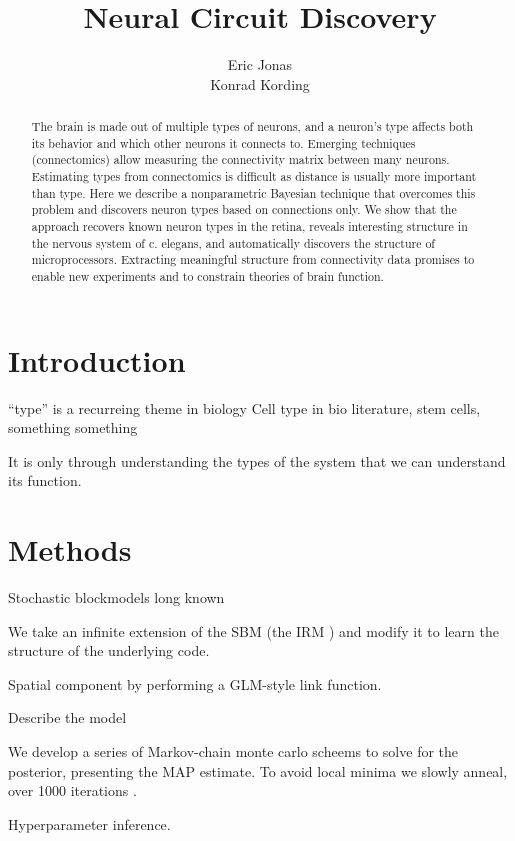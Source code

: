 \documentclass{article}
\title{Neural Circuit Discovery}
\author{Eric Jonas \\ Konrad Kording}
\begin{document}
\maketitle

\listoftodos

\begin{abstract}
  The brain is made out of multiple types of neurons, and a neuron’s
  type affects both its behavior and which other neurons it connects
  to. Emerging techniques (connectomics) allow measuring the
  connectivity matrix between many neurons. Estimating types from
  connectomics is difficult as distance is usually more important than
  type. Here we describe a nonparametric Bayesian technique that
  overcomes this problem and discovers neuron types based on
  connections only. We show that the approach recovers known neuron
  types in the retina, reveals interesting structure in the nervous
  system of c. elegans, and automatically discovers the structure of
  microprocessors. Extracting meaningful structure from connectivity
  data promises to enable new experiments and to constrain theories of
  brain function.

\end{abstract}

\section{Introduction}
``type'' is a recurreing theme in biology
Cell type in bio literature, stem cells, something something

It is only through understanding the types of the system that we can understand
its function. 

\section{Methods}
Stochastic blockmodels long known

We take an infinite extension of the SBM (the IRM ) 
and modify it to learn the structure of the underlying code. 


Spatial component by performing a GLM-style link function. 

Describe the model

We develop a series of Markov-chain monte carlo scheems to solve for
the posterior, presenting the MAP estimate. To avoid local minima we
slowly anneal, over 1000 iterations .

Hyperparameter inference. 
\end{document}
